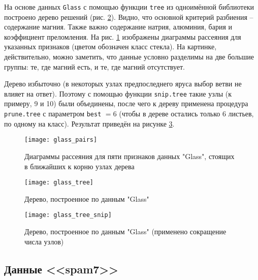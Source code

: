 \documentclass[a4paper,12pt]{article} %
\newcommand{\myPictWidth}{.95\textwidth}
\begin{document}
На основе данных \texttt{Glass} с помощью функции \texttt{tree} из одноимённой библиотеки построено дерево решений (рис. \ref{fig:glass_tree}).
Видно, что основной критерий разбиения -- содержание магния. Также важно содержание натрия, алюминия, бария и коэффициент преломления.
На рис. \ref{fig:glass_pairs} изображены диаграммы рассеяния для указанных признаков (цветом обозначен класс стекла). На картинке, действительно, можно заметить, что данные условно разделимы на две большие группы: те, где магний есть, и те, где магний отсутствует.

Дерево избыточно (в некоторых узлах предпоследнего яруса выбор ветви не влияет на ответ).
Поэтому с помощью функции \texttt{snip.tree} такие узлы (к примеру, 9 и 10) были объединены, после чего к дереву применена процедура \texttt{prune.tree} с параметром \texttt{best} $ = 6 $ (чтобы в дереве остались только 6 листьев, по одному на класс).
Результат приведён на рисунке \ref{fig:glass_tree_snip}.

\begin{figure}[H]
    \centering \texttt{[image: glass\_pairs]}
    \caption{Диаграммы рассеяния для пяти признаков данных "Glass"\hspace{0pt}, стоящих в ближайших к корню узлах дерева}
    \label{fig:glass_pairs}
\end{figure}

\begin{figure}[H]
    \centering \texttt{[image: glass\_tree]}
    \caption{Дерево, построенное по данным "Glass"}
    \label{fig:glass_tree}
\end{figure}

\begin{figure}[H]
    \centering \texttt{[image: glass\_tree\_snip]}
    \caption{Дерево, построенное по данным "Glass"\hspace{0pt} (применено сокращение числа узлов)}
    \label{fig:glass_tree_snip}
\end{figure}

\subsection{Данные <<spam7>>}
\end{document}

